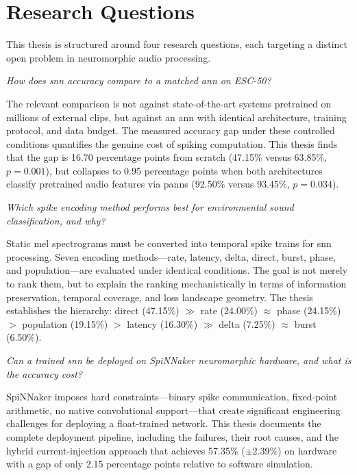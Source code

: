 \section{Research Questions}
\label{sec:research-questions}

This thesis is structured around four research questions, each targeting a distinct open problem in neuromorphic audio processing.

\begin{description}[style=nextline,leftmargin=1.5cm,labelwidth=1cm]

\item[\textbf{RQ1}] \textit{How does \gls{snn} accuracy compare to a matched \gls{ann} on ESC-50?}

The relevant comparison is not against state-of-the-art systems pretrained on millions of external clips, but against an \gls{ann} with identical architecture, training protocol, and data budget.
The measured accuracy gap under these controlled conditions quantifies the genuine cost of spiking computation.
This thesis finds that the gap is 16.70 percentage points from scratch (47.15\% versus 63.85\%, $p = 0.001$), but collapses to 0.95 percentage points when both architectures classify pretrained audio features via \gls{panns} (92.50\% versus 93.45\%, $p = 0.034$).

\item[\textbf{RQ2}] \textit{Which spike encoding method performs best for environmental sound classification, and why?}

Static mel spectrograms must be converted into temporal spike trains for \gls{snn} processing.
Seven encoding methods---rate, latency, delta, direct, burst, phase, and population---are evaluated under identical conditions.
The goal is not merely to rank them, but to explain the ranking mechanistically in terms of information preservation, temporal coverage, and loss landscape geometry.
The thesis establishes the hierarchy: direct (47.15\%) $\gg$ rate (24.00\%) $\approx$ phase (24.15\%) $>$ population (19.15\%) $>$ latency (16.30\%) $\gg$ delta (7.25\%) $\approx$ burst (6.50\%).

\item[\textbf{RQ3}] \textit{Can a trained \gls{snn} be deployed on SpiNNaker neuromorphic hardware, and what is the accuracy cost?}

SpiNNaker imposes hard constraints---binary spike communication, fixed-point arithmetic, no native convolutional support---that create significant engineering challenges for deploying a float-trained network.
This thesis documents the complete deployment pipeline, including the failures, their root causes, and the hybrid current-injection approach that achieves 57.35\% ($\pm$2.39\%) on hardware with a gap of only 2.15 percentage points relative to software simulation.


\end{description}
